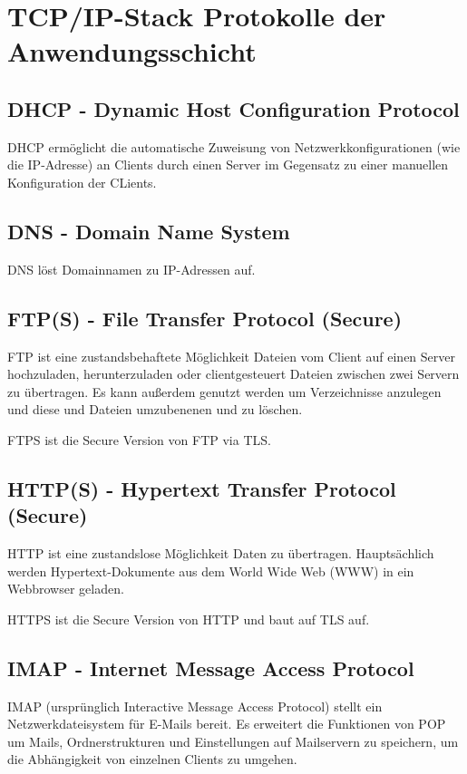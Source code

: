 \section{TCP/IP-Stack Protokolle der Anwendungsschicht}

\subsection{DHCP - Dynamic Host Configuration Protocol}

DHCP ermöglicht die automatische Zuweisung von Netzwerkkonfigurationen (wie die IP-Adresse) an Clients durch einen Server im Gegensatz zu einer manuellen Konfiguration der CLients.

\subsection{DNS - Domain Name System}

DNS löst Domainnamen zu IP-Adressen auf.

\subsection{FTP(S) - File Transfer Protocol (Secure)}

FTP ist eine zustandsbehaftete Möglichkeit Dateien vom Client auf einen Server hochzuladen, herunterzuladen oder clientgesteuert Dateien zwischen zwei Servern zu übertragen. Es kann außerdem genutzt werden um Verzeichnisse anzulegen und diese und Dateien umzubenenen und zu löschen.

FTPS ist die Secure Version von FTP via TLS.

\subsection{HTTP(S) - Hypertext Transfer Protocol (Secure)}

HTTP ist eine zustandslose Möglichkeit Daten zu übertragen. Hauptsächlich werden Hypertext-Dokumente aus dem World Wide Web (WWW) in ein Webbrowser geladen.

HTTPS ist die Secure Version von HTTP und baut auf TLS auf.

\subsection{IMAP - Internet Message Access Protocol}

IMAP (ursprünglich Interactive Message Access Protocol) stellt ein Netzwerkdateisystem für E-Mails bereit. Es erweitert die Funktionen von POP um Mails, Ordnerstrukturen und Einstellungen auf Mailservern zu speichern, um die Abhängigkeit von einzelnen Clients zu umgehen.

